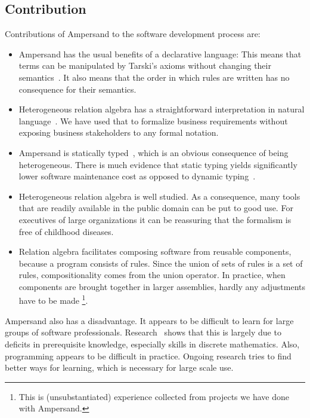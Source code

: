 \documentclass{elsarticle}
\begin{document}
\subsection{Contribution}
\label{sct:Contribution}
	Contributions of Ampersand to the software development process are:
\begin{itemize}
\item	Ampersand has the usual benefits of a declarative language:
	This means that terms can be manipulated by Tarski's axioms without changing their semantics~\cite{vdWoude2011}.
	It also means that the order in which rules are written has no consequence for their semantics.
\item	Heterogeneous relation algebra has a straightforward interpretation in natural language~\cite{RBD}.
	We have used that to formalize business requirements without exposing business stakeholders to any formal notation.
\item	Ampersand is statically typed~\cite{Joosten2015}, which is an obvious consequence of being heterogeneous.
	There is much evidence that static typing yields significantly lower software maintenance cost as opposed to dynamic typing~\cite{HanenbergKRTS14,Petersen2014}.
\item	Heterogeneous relation algebra is well studied.
	As a consequence, many tools that are readily available in the public domain can be put to good use.
	For executives of large organizations it can be reassuring that the formalism is free of childhood diseases.
\item	Relation algebra facilitates composing software from reusable components, because a program consists of rules.
	Since the union of sets of rules is a set of rules, compositionality comes from the union operator.
	In practice, when components are brought together in larger assemblies, hardly any adjustments have to be made%
\footnote{This is (unsubstantiated) experience collected from projects we have done with Ampersand.}.
\end{itemize}

	Ampersand also has a disadvantage. It appears to be difficult to learn for large groups of software professionals.
	Research~\cite{Michels2015} shows that this is largely due to deficits in prerequisite knowledge, especially skills in discrete mathematics.
	Also, programming appears to be difficult in practice.
	Ongoing research tries to find better ways for learning, which is necessary for large scale use.
\end{document}
